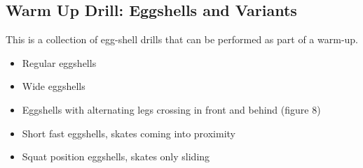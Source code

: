 \subsection*{Warm Up Drill: Eggshells and Variants}
\label{drill:sticky/eggshells/warm_up}

This is a collection of egg-shell drills that can be performed as part of a warm-up. 

\begin{itemize}
    \item Regular eggshells  
    \item Wide eggshells
    \item Eggshells with alternating legs crossing in front and behind (figure 8) 
    \item Short fast eggshells, skates coming into proximity 
    \item Squat position eggshells, skates only sliding    
\end{itemize}
